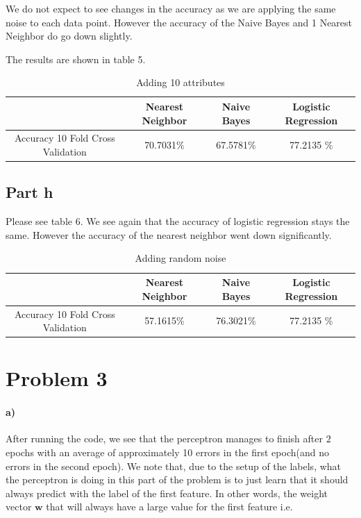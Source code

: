 \documentclass{article}
\begin{document}
We do not expect to see changes in the accuracy as we are applying the same noise to each data point. However the accuracy of the Naive Bayes and 1 Nearest Neighbor do go down slightly. 

The results are shown in table 5. 


\begin{table}[H]
    \begin{center}
    \caption{Adding 10 attributes}
    \begin{tabular}{|c|c|c|c|}
   \hline
        & Nearest Neighbor & Naive Bayes & Logistic Regression \\ \hline
         Accuracy 10 Fold Cross Validation &  70.7031\%&67.5781\% &  77.2135 \%  \\ \hline
        \end{tabular}
    \end{center}
\end{table}

\subsection{Part h}
Please see table 6. We see again that the accuracy of logistic regression stays the same. However the accuracy of the nearest neighbor went down significantly. 

\begin{table}[H]
    \begin{center}
    \caption{Adding random noise}
    \begin{tabular}{|c|c|c|c|}
   \hline
        & Nearest Neighbor & Naive Bayes & Logistic Regression \\ \hline
         Accuracy 10 Fold Cross Validation &  57.1615\%&76.3021\% &  77.2135 \%  \\ \hline
        \end{tabular}
    \end{center}
\end{table}

\section{Problem 3}

\paragraph{a)}
After running the code, we see that the perceptron manages to finish after $2$ epochs with an average of approximately 10 errors in the first epoch(and no errors in the second epoch). We note that, due to the setup of the labels, what the perceptron is doing in this part of the problem is to just learn that it should always predict with the label of the first feature. In other words, the weight vector $\mathbf{w}$ that will always have a large value for the first feature i.e.
\end{document}
